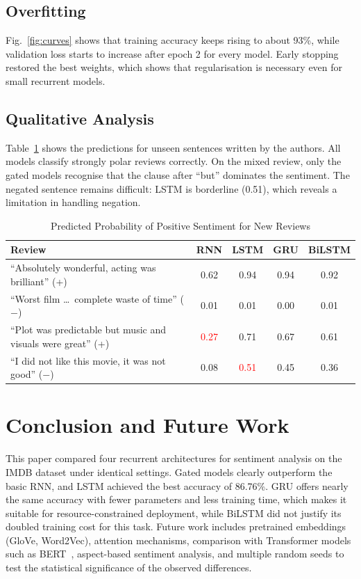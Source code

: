 \documentclass[conference]{IEEEtran}
\begin{document}
\subsection{Overfitting}
Fig.~\ref{fig:curves} shows that training accuracy keeps rising to about 93\%, while validation loss starts to increase after epoch 2 for every model. Early stopping restored the best weights, which shows that regularisation is necessary even for small recurrent models.

\subsection{Qualitative Analysis}
Table~\ref{tab:demo} shows the predictions for unseen sentences written by the authors. All models classify strongly polar reviews correctly. On the mixed review, only the gated models recognise that the clause after ``but'' dominates the sentiment. The negated sentence remains difficult: LSTM is borderline (0.51), which reveals a limitation in handling negation.

\begin{table}[htbp]
\caption{Predicted Probability of Positive Sentiment for New Reviews}
\label{tab:demo}
\centering
\setlength{\tabcolsep}{3pt}
\begin{tabular}{p{3.2cm}cccc}
\toprule
\textbf{Review} & \textbf{RNN} & \textbf{LSTM} & \textbf{GRU} & \textbf{BiLSTM} \\
\midrule
``Absolutely wonderful, acting was brilliant'' (+) & 0.62 & 0.94 & 0.94 & 0.92 \\
``Worst film \ldots\ complete waste of time'' ($-$) & 0.01 & 0.01 & 0.00 & 0.01 \\
``Plot was predictable but music and visuals were great'' (+) & \textcolor{red}{0.27} & 0.71 & 0.67 & 0.61 \\
``I did not like this movie, it was not good'' ($-$) & 0.08 & \textcolor{red}{0.51} & 0.45 & 0.36 \\
\bottomrule
\end{tabular}
\end{table}

\section{Conclusion and Future Work}
This paper compared four recurrent architectures for sentiment analysis on the IMDB dataset under identical settings. Gated models clearly outperform the basic RNN, and LSTM achieved the best accuracy of 86.76\%. GRU offers nearly the same accuracy with fewer parameters and less training time, which makes it suitable for resource-constrained deployment, while BiLSTM did not justify its doubled training cost for this task. Future work includes pretrained embeddings (GloVe, Word2Vec), attention mechanisms, comparison with Transformer models such as BERT~\cite{devlin2019}, aspect-based sentiment analysis, and multiple random seeds to test the statistical significance of the observed differences.
\end{document}
